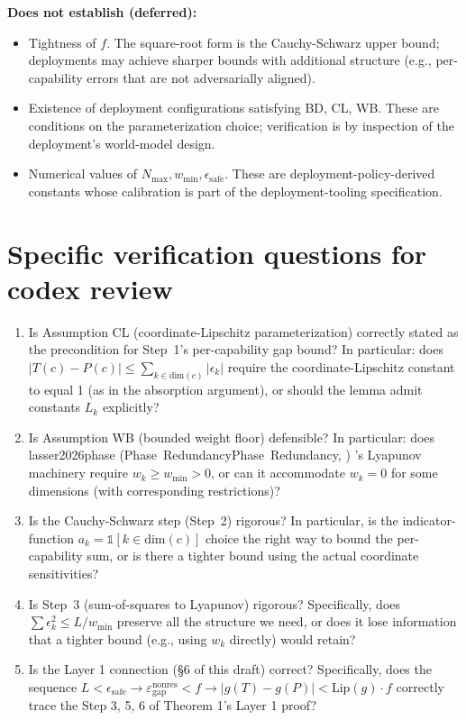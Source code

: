 \documentclass{article}
\makeatletter
\newcommand{\citep}[2][]{%
  \begingroup
  \def\@tmpkey{#2}%
  \ifx\@tmpkey\@empty\else
    (\ifx\@empty#1\@empty\else #1, \fi
     \@nameuse{bibkey@\@tmpkey})%
  \fi
  \endgroup
}
\newcommand{\Lyap}{L}
\newcommand{\epsnonres}{\varepsilon_{\mathrm{gap}}^{\mathrm{nonres}}}
\makeatother
\begin{document}
\textbf{Does not establish (deferred):}
\begin{itemize}
\item Tightness of $f$. The square-root form is the
  Cauchy-Schwarz upper bound; deployments may achieve sharper
  bounds with additional structure (e.g., per-capability errors
  that are not adversarially aligned).
\item Existence of deployment configurations satisfying BD, CL, WB.
  These are conditions on the parameterization choice; verification
  is by inspection of the deployment's world-model design.
\item Numerical values of $N_{\max}, w_{\min},
  \epsilon_{\mathrm{safe}}$. These are deployment-policy-derived
  constants whose calibration is part of the deployment-tooling
  specification.
\end{itemize}

\section{Specific verification questions for codex review}

\begin{enumerate}
\item Is Assumption CL (coordinate-Lipschitz parameterization)
  correctly stated as the precondition for Step~1's per-capability
  gap bound? In particular: does $|T(c) - P(c)| \leq \sum_{k \in
  \mathrm{dim}(c)} |\epsilon_k|$ require the coordinate-Lipschitz
  constant to equal 1 (as in the absorption argument), or should
  the lemma admit constants $L_k$ explicitly?

\item Is Assumption WB (bounded weight floor) defensible? In
  particular: does
  \citep[Phase~Redundancy]{lasser2026phase}'s Lyapunov machinery
  require $w_k \geq w_{\min} > 0$, or can it accommodate $w_k = 0$
  for some dimensions (with corresponding restrictions)?

\item Is the Cauchy-Schwarz step (Step~2) rigorous? In particular,
  is the indicator-function $a_k = \mathbb{1}[k \in
  \mathrm{dim}(c)]$ choice the right way to bound the per-capability
  sum, or is there a tighter bound using the actual coordinate
  sensitivities?

\item Is Step~3 (sum-of-squares to Lyapunov) rigorous?
  Specifically, does $\sum \epsilon_k^2 \leq \Lyap / w_{\min}$
  preserve all the structure we need, or does it lose information
  that a tighter bound (e.g., using $w_k$ directly) would retain?

\item Is the Layer 1 connection (\S6 of this draft) correct?
  Specifically, does the sequence
  $\Lyap < \epsilon_{\mathrm{safe}} \to \epsnonres < f \to
  |g(T) - g(P)| < \mathrm{Lip}(g) \cdot f$ correctly trace the
  Step 3, 5, 6 of Theorem 1's Layer 1 proof?
\end{enumerate}
\end{document}
